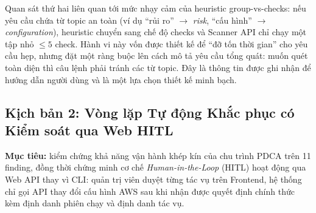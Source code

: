 Quan sát thứ hai liên quan tới mức nhạy cảm của heuristic group-vs-checks: nếu yêu cầu chứa từ topic an toàn (ví dụ ``rủi ro'' $\rightarrow$ \textit{risk}, ``cấu hình'' $\rightarrow$ \textit{configuration}), heuristic chuyển sang chế độ checks và Scanner API chỉ chạy một tập nhỏ $\le 5$ check. Hành vi này vốn được thiết kế để ``đỡ tốn thời gian'' cho yêu cầu hẹp, nhưng đặt một ràng buộc lên cách mô tả yêu cầu tổng quát: muốn quét toàn diện thì câu lệnh phải tránh các từ topic. Đây là thông tin được ghi nhận để hướng dẫn người dùng và là một lựa chọn thiết kế minh bạch.

\subsection{Kịch bản 2: Vòng lặp Tự động Khắc phục có Kiểm soát qua Web HITL}
\label{subsec:scenario_hitl}
\textbf{Mục tiêu:} kiểm chứng khả năng vận hành khép kín của chu trình PDCA trên 11 finding, đồng thời chứng minh cơ chế \textit{Human-in-the-Loop} (HITL) hoạt động qua Web API thay vì CLI: quản trị viên duyệt từng tác vụ trên Frontend, hệ thống chỉ gọi API thay đổi cấu hình AWS sau khi nhận được quyết định chính thức kèm định danh phiên chạy và định danh tác vụ.

